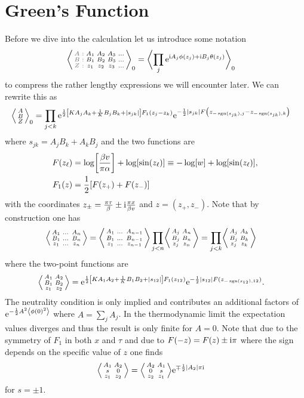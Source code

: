 \documentclass[english, parskip=full]{scrartcl}
\begin{document}
\section{Green's Function}
Before we dive into the calculation let us introduce some notation
\begin{align}
\bra*{\zabx{A_1&A_2&A_3&\dots}{B_1&B_2&B_3&\dots}{z_1&z_2&z_3&\dots}}_0 &= \bra[\bigg]{\prod_j \powe{\i A_j\phi(z_j) + \i B_j\theta(z_j)}}_0
\end{align}
to compress the rather lengthy expressions we will encounter later.
We can rewrite this as
\begin{align}
\bra*{\abx{A}{B}{Z}}_0 &= \prod_{j<k} \powe{\frac{1}{2}\klb*{KA_jA_k + \frac{1}{K}B_jB_k + \abs*{s_{jk}}}F_1(z_j-z_k)} \powe{-\frac{1}{2}|s_{jk}| F\kla*{z_{-\sgn(s_{jk}),j} - z_{-\sgn(s_{jk}), k}}}
\end{align}
where $s_{jk} = A_jB_k+A_kB_j$ and the two functions are
\begin{align}
F(z_\ell) &= \log\klb*{\frac{\beta v}{\pi\alpha}} + \log\klb*{\sin(z_\ell)} \equiv -\log\klb*{w} + \log\klb*{\sin(z_\ell)},\\
F_1(z) &= \frac{1}{2} \klb*{F(z_+) + F(z_-)}
\end{align}
with the coordinates $z_\pm = \frac{\pi\tau}{\beta} \pm \i \frac{\pi x}{\beta v}$ and $z=(z_+,z_-)$.
Note that by construction one has
\begin{align}
\bra*{\abx{A_1&\dots&A_n}{B_1&\dots&B_n}{z_1&\dots&z_n}} &= \bra*{\abx{A_1&\dots&A_{n-1}}{B_1&\dots&B_{n-1}}{z_1&\dots&z_{n-1}}} \prod_{j<n} \bra*{\abx{A_j&A_n}{B_j&B_n}{z_j&z_n}} = \prod_{j<k} \bra*{\abx{A_j&A_k}{B_j&B_k}{z_j&z_k}}
\end{align}
where the two-point functions are
\begin{align}
\bra*{\abx{A_1&A_2}{B_1&B_2}{z_1&z_2}} &= \powe{\frac{1}{2} \klb*{KA_1A_2 + \frac{1}{K} B_1B_2 + |s_{12}|}F_1(z_{12})} \powe{-\frac{1}{2} |s_{12}| F(z_{-\sgn(s_{12}),12})}.
\end{align}
The neutrality condition is only implied and contributes an additional factors of $\powe{-\frac{1}{2}A^2 \bra*{\phi(0)^2}}$ where $A=\sum_jA_j$.
In the thermodynamic limit the expectation values diverges and thus the result is only finite for $A=0$.
Note that due to the symmetry of $F_1$ in both $x$ and $\tau$ and due to $F(-z) = F(z) \pm \i \pi$ where the sign depends on the specific value of $z$ one finds
\begin{align}
\bra*{\abx{A_1&A_2}{s&0}{z_1&z_2}} &= \bra*{\abx{A_2&A_1}{0&s}{z_2&z_1}} \powe{\mp\frac{1}{2} |A_2|\pi\i}
\end{align}
for $s=\pm 1$.
\end{document}
